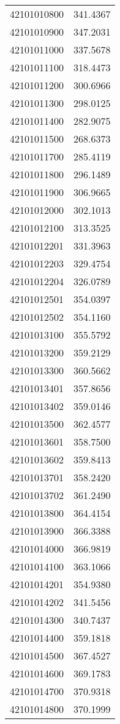 \begin{longtable}[t]{lr}
42101010800 & 341.4367\\
42101010900 & 347.2031\\
42101011000 & 337.5678\\
42101011100 & 318.4473\\
42101011200 & 300.6966\\
42101011300 & 298.0125\\
42101011400 & 282.9075\\
42101011500 & 268.6373\\
42101011700 & 285.4119\\
42101011800 & 296.1489\\
42101011900 & 306.9665\\
42101012000 & 302.1013\\
42101012100 & 313.3525\\
42101012201 & 331.3963\\
42101012203 & 329.4754\\
42101012204 & 326.0789\\
42101012501 & 354.0397\\
42101012502 & 354.1160\\
42101013100 & 355.5792\\
42101013200 & 359.2129\\
42101013300 & 360.5662\\
42101013401 & 357.8656\\
42101013402 & 359.0146\\
42101013500 & 362.4577\\
42101013601 & 358.7500\\
42101013602 & 359.8413\\
42101013701 & 358.2420\\
42101013702 & 361.2490\\
42101013800 & 364.4154\\
42101013900 & 366.3388\\
42101014000 & 366.9819\\
42101014100 & 363.1066\\
42101014201 & 354.9380\\
42101014202 & 341.5456\\
42101014300 & 340.7437\\
42101014400 & 359.1818\\
42101014500 & 367.4527\\
42101014600 & 369.1783\\
42101014700 & 370.9318\\
42101014800 & 370.1999\\

\end{longtable}

